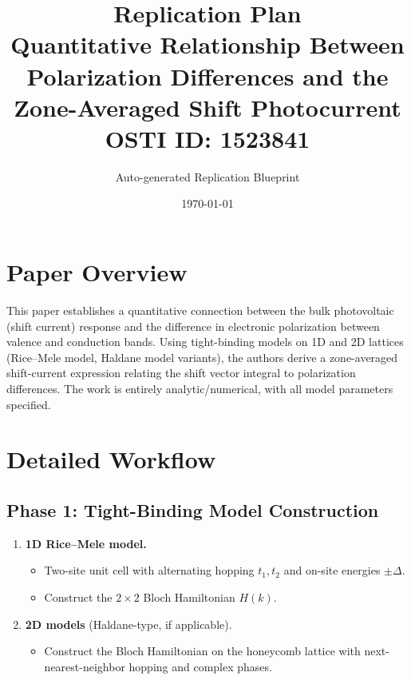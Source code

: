 \documentclass[11pt,a4paper]{article}
\title{\textbf{Replication Plan}\\[0.5em]
\large Quantitative Relationship Between Polarization Differences and the Zone-Averaged Shift Photocurrent\\[0.3em]
\normalsize OSTI ID: 1523841}
\author{Auto-generated Replication Blueprint}
\date{\today}
\begin{document}
\maketitle
\tableofcontents
\newpage

\section{Paper Overview}
This paper establishes a quantitative connection between the bulk photovoltaic (shift current) response and the difference in electronic polarization between valence and conduction bands. Using tight-binding models on 1D and 2D lattices (Rice--Mele model, Haldane model variants), the authors derive a zone-averaged shift-current expression relating the shift vector integral to polarization differences. The work is entirely analytic/numerical, with all model parameters specified.

\section{Detailed Workflow}

\subsection{Phase 1: Tight-Binding Model Construction}
\begin{enumerate}[label=\textbf{1.\arabic*}]
  \item \textbf{1D Rice--Mele model.}
    \begin{itemize}
      \item Two-site unit cell with alternating hopping $t_1, t_2$ and on-site energies $\pm \Delta$.
      \item Construct the $2 \times 2$ Bloch Hamiltonian $H(k)$.
    \end{itemize}
  \item \textbf{2D models} (Haldane-type, if applicable).
    \begin{itemize}
      \item Construct the Bloch Hamiltonian on the honeycomb lattice with next-nearest-neighbor hopping and complex phases.
    \end{itemize}
\end{enumerate}
\end{document}
